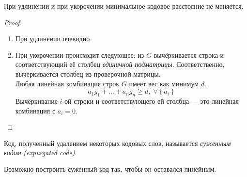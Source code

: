\begin{proposition}
При удлинении и при укорочении минимальное кодовое расстояние не меняется.\end{proposition}
\begin{proof}
~\\
\begin{enumerate}
\item При удлинении очевидно.
\item При укорочении происходит следующее: из $G$ вычёркивается строка
и соответствующий её столбец \emph{единичной подматрицы}. Соответственно,
вычёркивается столбец из проверочной матрицы.\\
Любая линейная комбинация строк $G$ имеет вес как минимум $d$. 
\[
a_{1}g_{1}+\ldots+a_{n}g_{n}\geq d,\;\forall\left\{ a_{i}\right\} 
\]
Вычёркивание $i$-ой строки и соответствующего ей столбца --- это
линейная комбинация с $a_{i}=0$.\end{enumerate}
\end{proof}

\begin{definition}
Код, полученный удалением некоторых кодовых слов, называется \emph{суженным
кодом (expurgated code)}.
\end{definition}
Возможно построить суженный код так, чтобы он оставался линейным.



